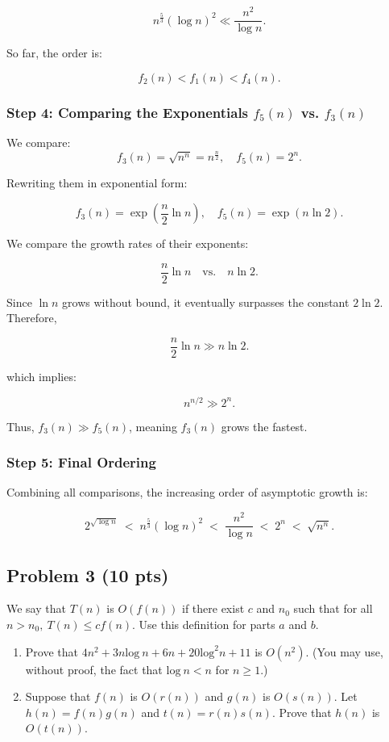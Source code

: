 \documentclass[12pt]{article}
\begin{document}
\[
n^{\frac{5}{3}} (\log n)^2 \ll \frac{n^2}{\log n}.
\]

So far, the order is:

\[
f_2(n) < f_1(n) < f_4(n).
\]

\subsubsection*{Step 4: Comparing the Exponentials \( f_5(n) \) vs. \( f_3(n) \)}
We compare:
\[
f_3(n) = \sqrt{n^n} = n^{\frac{n}{2}}, \quad f_5(n) = 2^n.
\]

Rewriting them in exponential form:

\[
f_3(n) = \exp\left( \frac{n}{2} \ln n \right), \quad f_5(n) = \exp(n \ln 2).
\]

We compare the growth rates of their exponents:

\[
\frac{n}{2} \ln n \quad \text{vs.} \quad n \ln 2.
\]

Since \( \ln n \) grows without bound, it eventually surpasses the constant \( 2 \ln 2 \). Therefore,

\[
\frac{n}{2} \ln n \gg n \ln 2.
\]

which implies:

\[
n^{n/2} \gg 2^n.
\]

Thus, \( f_3(n) \gg f_5(n) \), meaning \( f_3(n) \) grows the fastest.

\subsubsection*{Step 5: Final Ordering}
Combining all comparisons, the increasing order of asymptotic growth is:

\[
\boxed{
2^{\sqrt{\log n}} \;<\;
n^{\frac{5}{3}} (\log n)^2 \;<\;
\frac{n^2}{\log n} \;<\;
2^n \;<\;
\sqrt{n^n}.
}
\]

\subsection*{Problem 3 (10 pts)}
We say that $T(n)$ is $O(f(n))$ if there exist $c$ and $n_0$ such that for all $n > n_0,\:T(n) \le cf(n)$. Use this definition for parts $a$ and $b$.
\begin{enumerate}
    \item Prove that $4n^2 + 3n\text{log}\:n + 6n + 20\text{log}^2n + 11$ is $O(n^2)$. (You may use, without proof, the fact that $\text{log}\:n < n$ for $n \ge 1$.)
    \item Suppose that $f(n)$ is $O(r(n))$ and $g(n)$ is $O(s(n))$. Let $h(n) = f(n)g(n)$ and $t(n) = r(n)s(n)$. Prove that $h(n)$ is $O(t(n))$.
\end{enumerate}
\end{document}
